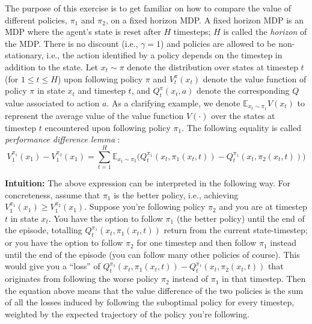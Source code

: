 \documentclass[11pt]{article}
\newcommand{\E}{\mathbb E}
\begin{document}
The purpose of this exercise is to get familiar on how to compare the value of different policies, $\pi_1$ and $\pi_2$, on a fixed horizon MDP. A fixed horizon MDP is an MDP where the agent's state is reset after $H$ timesteps; $H$ is called the \emph{horizon} of the MDP. There is no discount (i.e., $\gamma=1$) and policies are allowed to be non-stationary, i.e., the action identified by a policy depends on the timestep in addition to the state.
Let $x_t\sim \pi$ denote the distribution over states at timestep $t$ (for $1\leq t \leq H$) upon following policy $\pi$ and $V^{\pi}_t(x_t)$ denote the value function of policy $\pi$ in state 
$x_t$ and timestep $t$, and $Q_t^{\pi}(x_t,a)$ denote the corresponding 
$Q$ value associated to action $a$. As a clarifying example, we denote $\E_{x_t \sim \pi_1} V(x_t)$ to represent the average value of the value function $V(\cdot)$ over the states at timestep $t$ encountered upon following policy $\pi_1$. The following equality is called \emph{performance difference lemma} :
\begin{equation}
\label{eq:1}
V_1^{\pi_1}(x_1) - V_1^{\pi_2}(x_1) =  \sum_{t=1}^H \E_{x_t \sim \pi_2} \Big( Q_t^{\pi_1}(x_t,\pi_1(x_t,t)) - Q_t^{\pi_1}(x_t,\pi_2(x_t,t)) \Big)
\end{equation}

\textbf{Intuition:} The above expression can be interpreted in the following way. For concreteness, assume that $\pi_1$ is the better policy, i.e., achieving $V_1^{\pi_1}(x_1) \geq V_1^{\pi_2}(x_1)$. Suppose you're following policy $\pi_2$ and you are at timestep $t$ in state $x_t$. 
You have the option to follow $\pi_1$ (the better policy) until the end of the episode, totalling $Q_t^{\pi_1}(x_t,\pi_1(x_t,t))$ return from the current state-timestep; or you have the option to follow $\pi_2$ for one timestep and then follow $\pi_1$ instead until the end of the episode (you can follow many other policies of course). This would give you a ``loss'' of $Q_t^{\pi_1}(x_t,\pi_1(x_t,t)) - Q_t^{\pi_1}(x_t,\pi_2(x_t,t))$ that originates from following the worse policy $\pi_2$ instead of $\pi_1$ in that timestep. 
Then the equation above
means that the value difference of the two policies is the sum of all the losses induced by following the suboptimal policy for every timestep, weighted by the expected trajectory of the policy you're following.
\end{document}
